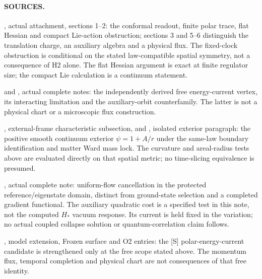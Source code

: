 \paragraph*{SOURCES.}
\begingroup\footnotesize
{},
actual attachment, sections 1--2:
the conformal readout, finite polar trace, flat Hessian and compact
Lie-action obstruction; sections 3 and 5--6 distinguish the
translation charge, an auxiliary algebra and a physical flux.
The fixed-clock obstruction is conditional on the stated
law-compatible spatial symmetry, not a consequence of H2 alone.
The flat Hessian argument is exact at finite regulator size;
the compact Lie calculation is a continuum statement.
\par
{}
and
,
actual complete notes:
the independently derived free energy-current vertex, its
interacting limitation and the auxiliary-orbit counterfamily.
The latter is not a physical chart or a microscopic flux
construction.
\par
{},
external-frame characteristic subsection, and
,
isolated exterior paragraph:
the positive smooth continuum exterior $\psi=1+A/r$ under the
same-law boundary identification and matter Ward mass lock.
The curvature and areal-radius tests above are evaluated directly
on that spatial metric; no time-slicing equivalence is presumed.
\par
{},
actual complete note:
uniform-flow cancellation in the protected reference/eigenstate
domain, distinct from ground-state selection and a completed
gradient functional.
The auxiliary quadratic cost is a specified test in this note,
not the computed $H_*$ vacuum response.
Its current is held fixed in the variation; no actual coupled
collapse solution or quantum-correlation claim follows.
\par
{},
model extension, Frozen surface and O2 entries:
the [S] polar-energy-current candidate is strengthened only at
the free scope stated above.
The momentum flux, temporal completion and physical chart are
not consequences of that free identity.
\endgroup
